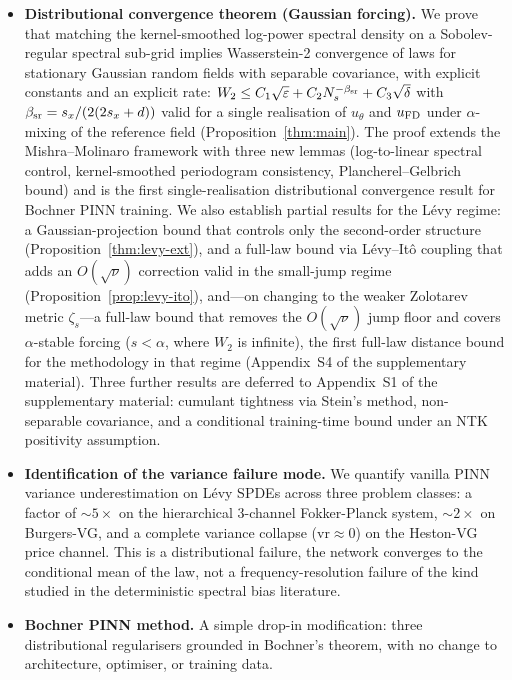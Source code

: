 \documentclass[review,12pt]{elsarticle}
\begin{document}
\begin{itemize}
\item \textbf{Distributional convergence theorem (Gaussian forcing).}
We prove that matching the kernel-smoothed log-power spectral density
on a Sobolev-regular spectral sub-grid implies Wasserstein-2
convergence of laws for stationary Gaussian random fields with
separable covariance, with explicit constants and an explicit rate:
\(W_2 \leq C_1\sqrt{\varepsilon} + C_2 N_s^{-\beta_{\rm sr}}
+ C_3\sqrt{\delta}\) with $\beta_{\rm sr} = s_x/(2(2s_x+d))$ valid
for a single realisation of $u_\theta$ and $u_{\rm FD}$ under
$\alpha$-mixing of the reference field (Proposition~\ref{thm:main}).
The proof extends the Mishra--Molinaro framework with three new
lemmas (log-to-linear spectral control, kernel-smoothed
periodogram consistency, Plancherel--Gelbrich bound) and is the
first single-realisation distributional convergence result for
Bochner PINN training. We also establish partial results for the
L\'evy regime: a Gaussian-projection bound that controls only the
second-order structure
(Proposition~\ref{thm:levy-ext}), and a full-law bound via L\'evy--It\^o
coupling that adds an $O(\sqrt{\nu})$ correction valid in the
small-jump regime
(Proposition~\ref{prop:levy-ito}), and---on changing to the weaker
Zolotarev metric $\zeta_s$---a full-law bound that removes the
$O(\sqrt{\nu})$ jump floor and covers $\alpha$-stable forcing
($s < \alpha$, where $W_2$ is infinite), the first full-law distance
bound for the methodology in that regime (Appendix~S4 of the
supplementary material).
Three further results are deferred to Appendix~S1 of the supplementary
material: cumulant tightness via Stein's method, non-separable
covariance, and a conditional training-time bound under an NTK
positivity assumption.

\item \textbf{Identification of the variance failure mode.} We quantify
vanilla PINN variance underestimation on L\'evy SPDEs across three
problem classes: a factor of \(\sim 5\times\) on the hierarchical
3-channel Fokker-Planck system, \(\sim 2\times\) on Burgers-VG, and a
complete variance collapse (\(\mathrm{vr} \approx 0\)) on the
Heston-VG price channel. This is a distributional failure, the
network converges to the conditional mean of the law, not a
frequency-resolution failure of the kind studied in the deterministic
spectral bias literature.

\item \textbf{Bochner PINN method.} A simple drop-in modification:
three distributional regularisers grounded in Bochner's theorem, with
no change to architecture, optimiser, or training data.


\end{itemize}
\end{document}
